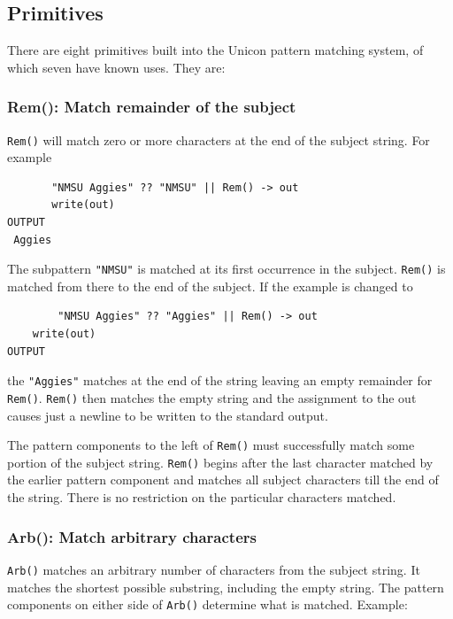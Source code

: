 \documentclass[letterpaper,12pt]{article}
\begin{document}
\subsection{Primitives}

There are eight primitives built into the Unicon pattern matching
system, of which seven have known uses. They are:

\subsubsection{Rem(): Match remainder of the subject}

{\tt Rem()} will match zero or more characters at the end of the subject
string. For example

\begin{verbatim}
       "NMSU Aggies" ?? "NMSU" || Rem() -> out
       write(out)
OUTPUT
 Aggies
\end{verbatim}

The subpattern {\tt "NMSU"} is matched at its first occurrence in the
subject. {\tt Rem()} is matched from there to the end of the subject.
If the example is changed to

\begin{verbatim}
        "NMSU Aggies" ?? "Aggies" || Rem() -> out
	write(out)
OUTPUT

\end{verbatim}

\noindent the {\tt "Aggies"} matches at the end of the string leaving an empty
remainder for {\tt Rem()}. {\tt Rem()} then matches the empty string
and the assignment to the out causes just a newline to be written to the
standard output.

The pattern components to the left of {\tt Rem()} must successfully match
some portion of the subject string. {\tt Rem()} begins after the last
character matched by the earlier pattern component and matches all
subject characters till the end of the string. There is no restriction
on the particular characters matched.

\subsubsection{Arb(): Match arbitrary characters}

{\tt Arb()} matches an arbitrary number of characters from the subject
string.  It matches the shortest possible substring, including the
empty string. The pattern components on either side of {\tt Arb()} determine
what is matched. Example:
\end{document}
